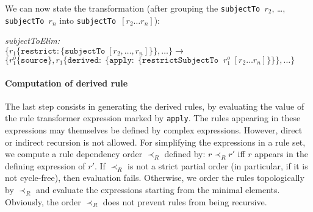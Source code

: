 We can now state the transformation (after grouping the
\texttt{subjectTo $r_2$}, \dots, \texttt{subjectTo $r_n$} into
\texttt{subjectTo $[r_2 \dots r_n]$}):


\noindent
\emph{subjectToElim:}\\
$
\{r_1 \{\mathtt{restrict}: \{\mathtt{subjectTo}\; [r_2, \dots, r_n]\}\}, \dots \} \longrightarrow$\\
$\{r_1^o \{\mathtt{source}\}, r_1 \{\mathtt{derived:}\; \{\mathtt{apply:}\; \{
\mathtt{restrictSubjectTo}\;\; r_1^o\; [r_2 \dots r_n] \}\}\}, \dots \}
$



\paragraph{\textbf{Computation of derived rule}}
The last step consists in generating the derived rules, by evaluating the
value of the rule transformer expression marked by \texttt{apply}. The rules
appearing in these expressions may themselves be defined by complex
expressions. However, direct or indirect recursion is not allowed. For
simplifying the expressions in a rule set, we compute a rule dependency order
$\prec_R$ defined by: $r \prec_R r'$ iff $r$ appears in the defining
expression of $r'$. If $\prec_R$ is not a strict partial order (in particular, if
it is not cycle-free), then evaluation fails. Otherwise, we order the rules
topologically by $\prec_R$ and evaluate the expressions starting from the
minimal elements. Obviously, the order $\prec_R$ does not prevent rules from being recursive.

